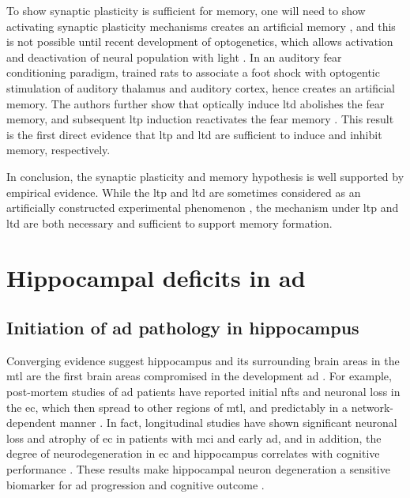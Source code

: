 To show synaptic plasticity is sufficient for memory, one will need to show activating synaptic plasticity mechanisms creates an artificial memory \citep{neves08}, and this is not possible until recent development of optogenetics, which allows activation and deactivation of neural population with light  \citep{zhang07, rajasethupathy16}. In an auditory fear conditioning paradigm, \citet{nabavi14} trained rats to associate a foot shock with optogentic stimulation of auditory thalamus and auditory cortex, hence creates an artificial memory. The authors further show that optically induce \gls{ltd} abolishes the fear memory, and subsequent \gls{ltp} induction reactivates the fear memory \citep{nabavi14}. This result is the first direct evidence that \gls{ltp} and \gls{ltd} are sufficient to induce and inhibit memory, respectively. 

In conclusion, the synaptic plasticity and memory hypothesis is well supported by empirical evidence. While the \gls{ltp} and \gls{ltd} are sometimes considered as an artificially constructed experimental phenomenon \citep{stevens98}, the mechanism under \gls{ltp} and \gls{ltd} are both necessary and sufficient to support memory formation.

\section{Hippocampal deficits in \gls{ad}}
\subsection{Initiation of \gls{ad} pathology in hippocampus}
Converging evidence suggest hippocampus and its surrounding brain areas in the \gls{mtl} are the first brain areas compromised in the development \gls{ad} \citep{palmer11, zhou16}. For example, post-mortem studies of \gls{ad} patients have reported initial \glspl{nft} and neuronal loss in the \gls{ec}, which then spread to other regions of \gls{mtl}, and predictably in a network-dependent manner \citep{braak91,  hoesen93, zhan09}. In fact, longitudinal studies have shown significant neuronal loss and atrophy of \gls{ec} in patients with \gls{mci} and early \gls{ad}, and in addition, the degree of neurodegeneration in \gls{ec} and hippocampus correlates with cognitive performance \citep{kordower01, jack02, pennanen04}. These results make hippocampal neuron degeneration a sensitive biomarker for \gls{ad} progression and cognitive outcome \citep{jack02, zhou16}. 

